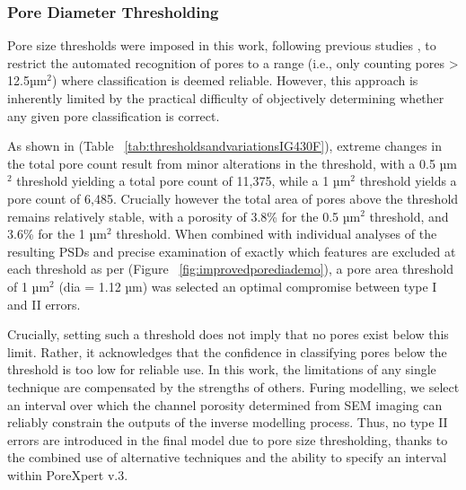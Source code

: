 \documentclass[3p,twocolumn]{elsarticle}
\begin{document}
	\subsubsection{Pore Diameter Thresholding}
    
  Pore size thresholds were imposed in this work, following previous studies
  \citep{Taylor2016, Huang2019, Kane2011a}, to restrict the automated
  recognition of pores to a range (i.e., only counting pores > 12.5µm\(^2\))
  where classification is deemed reliable. However, this approach is inherently
  limited by the practical difficulty of objectively determining whether any
  given pore classification is correct.
      
  As shown in (Table ~\ref{tab:thresholdsandvariationsIG430F}), extreme changes
  in the total pore count result from minor alterations in the threshold, with a
  0.5 µm\(^2\) threshold yielding a total pore count of 11,375, while a 1
  µm\(^2\) threshold yields a pore count of 6,485. Crucially however the total
  area of pores above the threshold remains relatively stable, with a porosity
  of 3.8\% for the 0.5 µm\(^2\) threshold, and 3.6\% for the 1 µm\(^2\)
  threshold. When combined with individual analyses of the resulting PSDs and
  precise examination of exactly which features are excluded at each threshold
  as per (Figure ~\ref{fig:improvedporediademo}), a pore area threshold of 1
  µm\(^2\) (dia = 1.12 µm) was selected an optimal compromise between type I and
  II errors.

   Crucially, setting such a threshold does not imply that no pores exist below
   this limit. Rather, it acknowledges that the confidence in classifying pores
   below the threshold is too low for reliable use. In this work, the
   limitations of any single technique are compensated by the strengths of
   others. Furing modelling, we select an interval over which the channel
   porosity determined from SEM imaging can reliably constrain the outputs of
   the inverse modelling process. Thus, no type II errors are introduced in the
   final model due to pore size thresholding, thanks to the combined use of
   alternative techniques and the ability to specify an interval within
   PoreXpert v.3.

\end{document}
